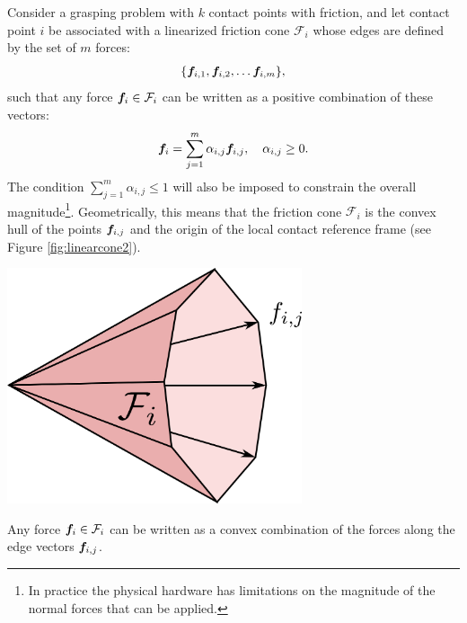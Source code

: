 \begin{example} \label{ex:2Dgrasp}
Consider a grasping problem with $k$ contact points with friction, and let contact point $i$ be associated with a linearized friction cone $\mathcal{F}_i$ whose edges are defined by the set of $m$ forces:
\begin{equation*}
    \{\f_{i,1}, \f_{i,2}, \dots \f_{i,m}\},
\end{equation*}
such that any force $\bm{f}_i \in \mathcal{F}_i$ can be written as a positive combination of these vectors:
\begin{equation*}
    \bm{f}_i = \sum_{j=1}^m \alpha_{i,j}\bm{f}_{i,j}, \quad \alpha_{i,j} \geq 0.
\end{equation*}
The condition $\sum_{j=1}^m \alpha_{i,j} \leq 1$ will also be imposed to constrain the overall magnitude\footnote[][]{In practice the physical hardware has limitations on the magnitude of the normal forces that can be applied.}. Geometrically, this means that the friction cone $\mathcal{F}_i$ is the convex hull of the points $\bm{f}_{i,j}$ and the origin of the local contact reference frame (see Figure \ref{fig:linearcone2}).
\begin{marginfigure} 
\begin{center}
\includegraphics[width=0.65\textwidth]{tex/figs/ch26_figs/linearfrictioncone2.png}
\caption{Any force $\bm{f}_i \in \mathcal{F}_i$ can be written as a convex combination of the forces along the edge vectors $\bm{f}_{i,j}$.}
\label{fig:linearcone2}
\end{center}
\end{marginfigure}


\end{example}

